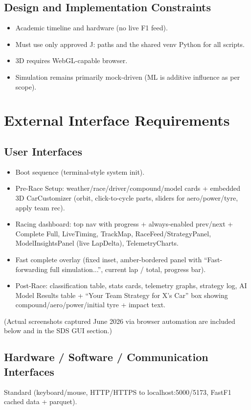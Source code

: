 \documentclass[12pt,a4paper]{article}
\begin{document}
\subsection{Design and Implementation Constraints}
\begin{itemize}
\item Academic timeline and hardware (no live F1 feed).
\item Must use only approved J: paths and the shared venv Python for all scripts.
\item 3D requires WebGL-capable browser.
\item Simulation remains primarily mock-driven (ML is additive influence as per scope).
\end{itemize}

\section{External Interface Requirements}
\subsection{User Interfaces}
\begin{itemize}
\item Boot sequence (terminal-style system init).
\item Pre-Race Setup: weather/race/driver/compound/model cards + embedded 3D CarCustomizer (orbit, click-to-cycle parts, sliders for aero/power/tyre, apply team rec).
\item Racing dashboard: top nav with progress + always-enabled prev/next + Complete Full, LiveTiming, TrackMap, RaceFeed/StrategyPanel, ModelInsightsPanel (live LapDelta), TelemetryCharts.
\item Fast complete overlay (fixed inset, amber-bordered panel with ``Fast-forwarding full simulation...'', current lap / total, progress bar).
\item Post-Race: classification table, stats cards, telemetry graphs, strategy log, AI Model Results table + ``Your Team Strategy for X's Car'' box showing compound/aero/power/initial tyre + impact text.
\end{itemize}

(Actual screenshots captured June 2026 via browser automation are included below and in the SDS GUI section.)

\subsection{Hardware / Software / Communication Interfaces}
Standard (keyboard/mouse, HTTP/HTTPS to localhost:5000/5173, FastF1 cached data + parquet).
\end{document}
